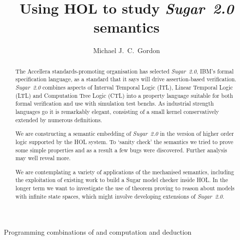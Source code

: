 \documentclass{llncs}
\newcommand\Sugar{{\it{Sugar~2.0}}\xspace}
\newcommand\Hol{HOL\xspace}
\begin{document}
\pagestyle{headings}                  %

\title{Using HOL to study \Sugar semantics}

\titlerunning%
{Programming combinations of%
and computation and deduction}        %
 

\author{Michael J.~C.~Gordon}



\maketitle                            %

\vspace*{-6mm}

\begin{abstract}
The Accellera standards-promoting organisation has selected \Sugar,
IBM's formal specification language, as a standard that it says will
drive assertion-based verification.
\Sugar combines aspects of Interval Temporal Logic (ITL), Linear
Temporal Logic (LTL) and Computation Tree Logic (CTL) into a property
language suitable for both formal verification and use with simulation
test benchs. As industrial strength languages go it is remarkably
elegant, consisting of a small kernel conservatively extended by
numerous definitions.

We are constructing a semantic embedding of \Sugar in the version of
higher order logic supported by the \Hol system. To `sanity check' the
semantics we tried to prove some simple properties and as a result a few bugs
were discovered. Further analysis may well reveal more.

%

We are contemplating a variety of applications of the mechanised
semantics, including the exploitation of existing work to build a
Sugar model checker inside \Hol. In the longer term we want to
investigate the use of theorem proving to reason about models with
infinite state spaces, which might involve developing extensions of
\Sugar.
\end{abstract}
\end{document}
